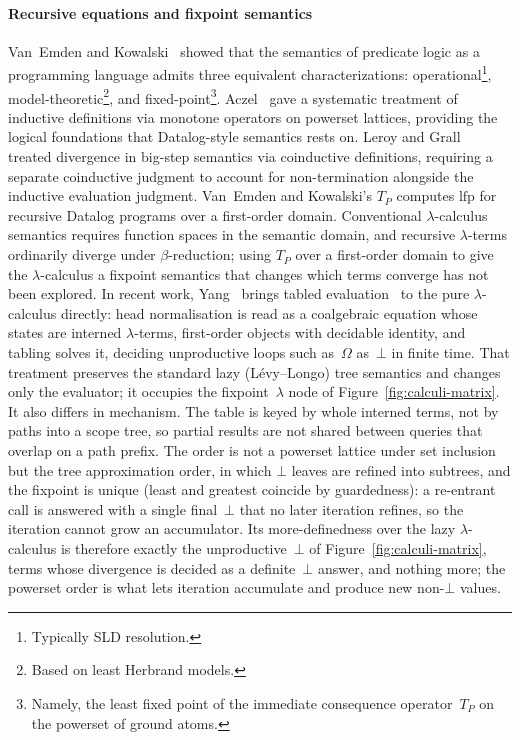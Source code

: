 \paragraph{Recursive equations and fixpoint semantics}
Van~Emden and Kowalski~\cite{vanemden1976-predicate-logic-semantics} showed that
the semantics of predicate logic as a programming language admits
three equivalent characterizations:
operational\footnote{
  Typically SLD resolution.
}, model-theoretic\footnote{
  Based on least Herbrand models.
}, and fixed-point\footnote{
  Namely, the least fixed point of the immediate consequence operator~$T_P$ on the powerset of ground atoms.
}.
Aczel~\cite{aczel1977-inductive-definitions} gave a systematic treatment of
inductive definitions via monotone operators on powerset lattices,
providing the logical foundations that Datalog-style semantics
rests on.
Leroy and Grall~\cite{leroy2006-coinductive-big-step} treated divergence
in big-step semantics via coinductive definitions,
requiring a separate coinductive judgment to account for
non-termination alongside the inductive evaluation judgment.
Van~Emden and Kowalski's $T_P$ computes
$\mathrm{lfp}$ for recursive Datalog programs over a
first-order domain.
Conventional $\lambda$-calculus semantics requires function
spaces in the semantic domain, and recursive $\lambda$-terms
ordinarily diverge under $\beta$-reduction;
using $T_P$ over a first-order domain to give the
$\lambda$-calculus a fixpoint semantics that changes which
terms converge has not been explored.
In recent work, Yang~\cite{yang2026-co-lambda} brings tabled
evaluation~\cite{tamaki1986-tabled-resolution} to the pure
$\lambda$-calculus directly: head normalisation is read as a
coalgebraic equation whose states are interned
$\lambda$-terms, first-order objects with decidable identity,
and tabling solves it, deciding unproductive loops such
as~$\Omega$ as~$\bot$ in finite time.
That treatment preserves the standard lazy
(L\'evy--Longo) tree semantics and changes only the evaluator;
it occupies the fixpoint~$\lambda$ node of
Figure~\ref{fig:calculi-matrix}.
It also differs in mechanism.
The table is keyed by whole interned terms, not by paths
into a scope tree, so partial results are not shared between
queries that overlap on a path prefix.
The order is not a powerset lattice under set inclusion but
the tree approximation order, in which $\bot$ leaves are
refined into subtrees, and the fixpoint is unique (least and
greatest coincide by guardedness): a re-entrant call is
answered with a single final~$\bot$ that no later iteration
refines, so the iteration cannot grow an accumulator.
Its more-definedness over the lazy $\lambda$-calculus is
therefore exactly the unproductive~$\bot$ of
Figure~\ref{fig:calculi-matrix}, terms whose divergence is
decided as a definite~$\bot$ answer, and nothing more;
the powerset order is what lets iteration accumulate and
produce new non-$\bot$ values.

